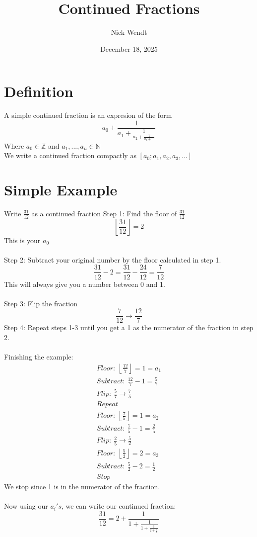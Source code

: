\documentclass{article}
\title{Continued Fractions}
\author{Nick Wendt}
\date{December 18, 2025}
\begin{document}
\maketitle
\section*{Definition}
A simple continued fraction is an expresion of the form
$$
a_0+\frac{1}{a_1+\frac{1}{a_2+\frac{1}{a_3+...}}}
$$
Where $a_0 \in \mathbb{Z}$ and $a_1, ...,a_n \in \mathbb{N}$
\\
We write a continued fraction compactly as $[a_0;a_1,a_2,a_3,...]$
\section*{Simple Example}
Write $\frac{31}{12}$ as a continued fraction
Step 1: Find the floor of $\frac{31}{12}$
$$
\left\lfloor{\frac{31}{12}}\right\rfloor = 2
$$
This is your $a_0$\\
\\
Step 2: Subtract your original number by the floor calculated in step 1.
$$
\frac{31}{12} - 2 = \frac{31}{12} - \frac{24}{12} = \frac{7}{12}
$$
This will always give you a number between 0 and 1.\\
\\
Step 3: Flip the fraction 
$$
\frac{7}{12} \rightarrow \frac{12}{7}
$$
Step 4: Repeat steps 1-3 until you get a 1 as the numerator of the fraction in step 2.\\
\\
Finishing the example:
\begin{gather*}
Floor:\ \left\lfloor{\frac{12}{7}} \right\rfloor = 1 = a_1\\
Subtract:\ \frac{12}{7} - 1 = \frac{5}{7}\\
Flip:\ \frac{5}{7} \rightarrow \frac{7}{5}\\
Repeat\\
Floor:\  \left\lfloor{\frac{7}{5}}\right\rfloor = 1 = a_2\\
Subtract:\ \frac{7}{5} - 1 = \frac{2}{5}\\
Flip:\ \frac{2}{5} \rightarrow \frac{5}{2}\\
Floor:\ \left\lfloor{\frac{5}{2}}\right\rfloor = 2 = a_3\\
Subtract:\ \frac{5}{2} - 2 = \frac{1}{2}\\
Stop
\end{gather*}
We stop since 1 is in the numerator of the fraction.\\
\\
Now using our $a_i's$, we can write our continued fraction:
$$
\frac{31}{12} = 2 + \frac{1}{1+\frac{1}{1+\frac{1}{2+\frac{1}{2}}}}
$$
\end{document}
